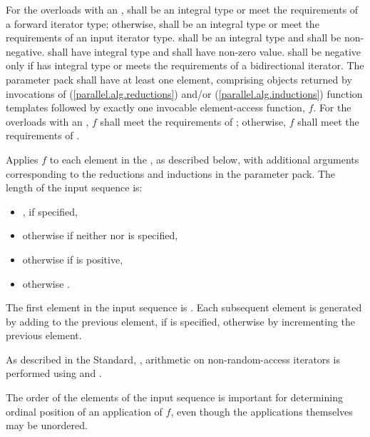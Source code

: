 \begin{itemdescr}
\pnum
\requires For the overloads with an ,  shall be an integral type or meet the requirements of a forward iterator type; otherwise,  shall be an integral type or meet the requirements of an input iterator type.  shall be an integral type and  shall be non-negative.  shall have integral type and  shall have non-zero value.  shall be negative only if  has integral type or meets the requirements of a bidirectional iterator. The  parameter pack shall have at least one element, comprising objects returned by invocations of  (\ref{parallel.alg.reductions}) and/or  (\ref{parallel.alg.inductions}) function templates followed by exactly one invocable element-access function, $f$. For the overloads with an , $f$ shall meet the requirements of ; otherwise, $f$ shall meet the requirements of .

\pnum
\effects Applies $f$ to each element in the , as described below, with additional arguments corresponding to the reductions and inductions in the  parameter pack. The length of the input sequence is:

\begin{itemize}
\item {}, if specified,

\item otherwise  if neither  nor  is specified,

\item otherwise  if  is positive,

\item otherwise .
\end{itemize}

The first element in the input sequence is . Each subsequent element is generated by adding  to the previous element, if  is specified, otherwise by incrementing the previous element.
\begin{note}As described in the \Cpp Standard, , arithmetic on non-random-access iterators is performed using  and .\end{note}
\begin{note}The order of the elements of the input sequence is important for determining ordinal position of an application of $f$, even though the applications themselves may be unordered.\end{note}


\end{itemdescr}
